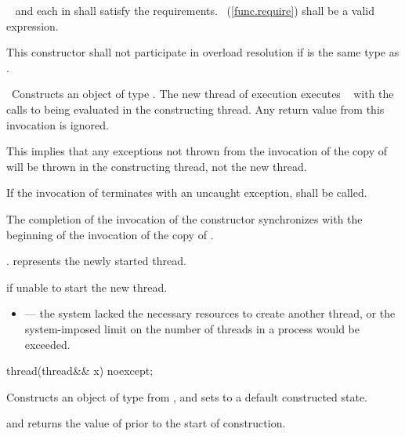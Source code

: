\begin{itemdescr}
\pnum
\requires\  and each  in  shall satisfy the
 requirements.
~(\ref{func.require}) shall be
a valid expression.

\pnum
\remarks
This constructor shall not participate in overload resolution if 
is the same type as .

\pnum
\effects\ Constructs an object of type . The new thread of execution executes
\
 with the calls to
\brk{}\tcode{\textit{DECAY_COPY}} being evaluated in the constructing thread. Any return value from this invocation
is ignored. \begin{note} This implies that any exceptions not thrown from the invocation of the copy
of \tcode{f} will be thrown in the constructing thread, not the new thread. \end{note} If the
invocation of
terminates with an uncaught exception, \tcode{std::terminate} shall be called.


\pnum\sync The completion of the invocation of the constructor
synchronizes with the beginning of the invocation of the copy of .

\pnum\postconditions {}.  represents the newly started thread.

\pnum\throws {} if unable to start the new thread.

\pnum\errors
\begin{itemize}
\item {} --- the system lacked the necessary
resources to create another thread, or the system-imposed limit on the number of
threads in a process would be exceeded.
\end{itemize}
\end{itemdescr}

%
\begin{itemdecl}
thread(thread&& x) noexcept;
\end{itemdecl}

\begin{itemdescr}
\pnum
\effects Constructs an object of type  from , and sets
\tcode{x} to a default constructed state.

\pnum
\postconditions {} and  returns the
value of \tcode{x.get_id()} prior to the start of construction.

\end{itemdescr}

